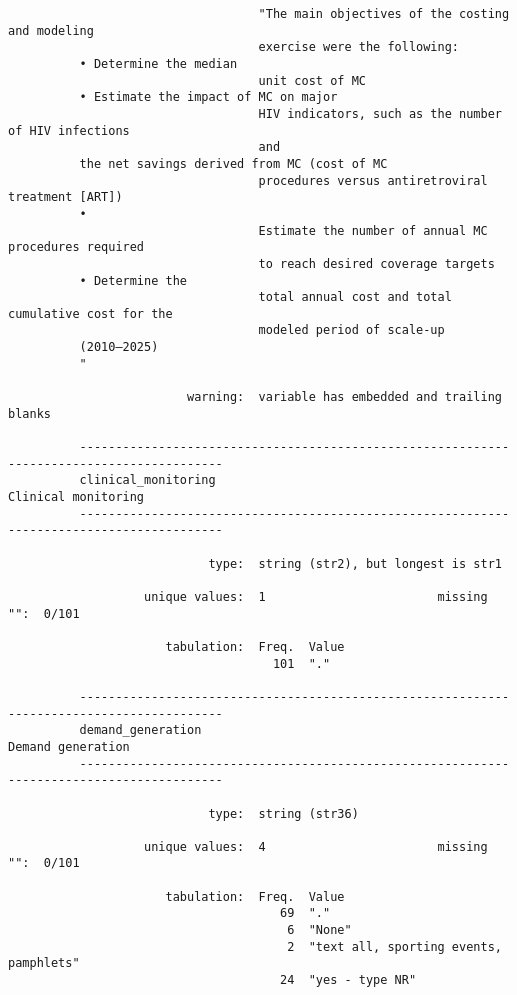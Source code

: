 \documentclass{article}
\begin{document}
\begin{verbatim}
                                   "The main objectives of the costing and modeling
                                   exercise were the following:
          • Determine the median
                                   unit cost of MC
          • Estimate the impact of MC on major
                                   HIV indicators, such as the number of HIV infections
                                   and
          the net savings derived from MC (cost of MC
                                   procedures versus antiretroviral treatment [ART])
          •
                                   Estimate the number of annual MC procedures required
                                   to reach desired coverage targets
          • Determine the
                                   total annual cost and total cumulative cost for the
                                   modeled period of scale-up
          (2010–2025)
          "
          
                         warning:  variable has embedded and trailing blanks
          
          ------------------------------------------------------------------------------------------
          clinical_monitoring                                                    Clinical monitoring
          ------------------------------------------------------------------------------------------
          
                            type:  string (str2), but longest is str1
          
                   unique values:  1                        missing "":  0/101
          
                      tabulation:  Freq.  Value
                                     101  "."
          
          ------------------------------------------------------------------------------------------
          demand_generation                                                        Demand generation
          ------------------------------------------------------------------------------------------
          
                            type:  string (str36)
          
                   unique values:  4                        missing "":  0/101
          
                      tabulation:  Freq.  Value
                                      69  "."
                                       6  "None"
                                       2  "text all, sporting events, pamphlets"
                                      24  "yes - type NR"
          

\end{verbatim}
\end{document}
